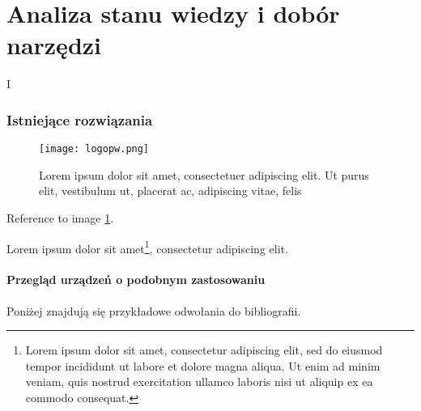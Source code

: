 \part{Analiza stanu wiedzy i dobór narzędzi}{I}

\noindent\lipsum[1-3]
\clearpage\section{Istniejące rozwiązania}
\noindent\lipsum[1-3]

\begin{figure}[!h]
    \centering \texttt{[image: logopw.png]}
    
    \caption{Lorem ipsum dolor sit amet, consectetuer adipiscing elit. Ut purus
    elit, vestibulum ut, placerat ac, adipiscing vitae, felis}
    \label{fig:tradycyjne-logo-pw}
\end{figure}

\lipsum[1-3] Reference to image \ref{fig:tradycyjne-logo-pw}.

\lipsum[4] Lorem ipsum dolor sit amet\footnote{Lorem ipsum dolor sit amet, consectetur adipiscing elit, sed do eiusmod tempor incididunt ut labore et dolore magna aliqua. Ut enim ad minim veniam, quis nostrud exercitation ullamco laboris nisi ut aliquip ex ea commodo consequat.}, consectetur adipiscing elit.

\subsection{Przegląd urządzeń o podobnym zastosowaniu}

\noindent Poniżej znajdują się przykładowe odwołania do bibliografii. 


